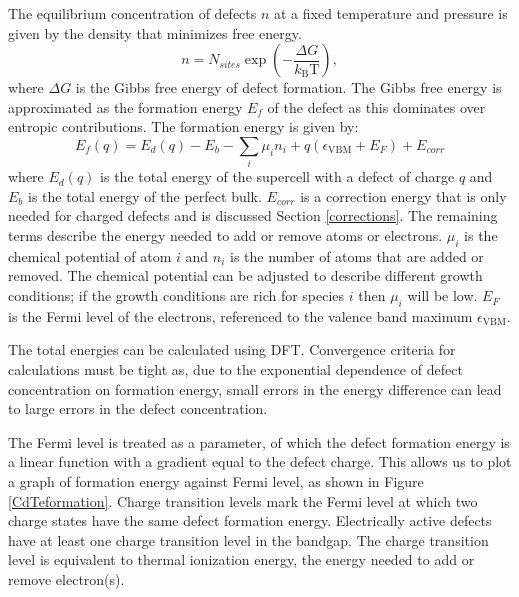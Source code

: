 The equilibrium concentration of defects $n$ at a fixed temperature and pressure is given by the density that minimizes free energy.
\begin{equation} \label{defectconcentration}
    n = N_{sites} \exp \left(-\frac{\Delta G}{k_\mathrm{B} \mathrm{T}} \right),
\end{equation}
where $\Delta G$ is the Gibbs free energy of defect formation. The Gibbs free energy is approximated as the formation energy $E_f$ of the defect as this dominates over entropic contributions. The formation energy is given by:
\begin{equation} \label{eqn_formation_energy}
E_f(q) = E_d(q) - E_b - \sum_i \mu_i n_i + q(\epsilon_\mathrm{VBM}+E_F) + E_{corr}
\end{equation}
where $E_d(q)$ is the total energy of the supercell with a defect of charge $q$ and $E_b$ is the total energy of the perfect bulk. 
$E_{corr}$ is a correction energy that is only needed for charged defects and is discussed Section \ref{corrections}.
The remaining terms describe the energy needed to add or remove atoms or electrons.
$\mu_i$ is the chemical potential of atom $i$ and $n_i$ is the number of atoms that are added or removed.
The chemical potential can be adjusted to describe different growth conditions; if the growth conditions are rich for species $i$ then $\mu_i$ will be low.
$E_F$ is the Fermi level of the electrons, referenced to the valence band maximum $\epsilon_\mathrm{VBM}$.

The total energies can be calculated using DFT. Convergence criteria for calculations must be tight as, due to the exponential dependence of defect concentration on formation energy, small errors in the energy difference can lead to large errors in the defect concentration.

The Fermi level is treated as a parameter, of which the defect formation energy is a linear function with a gradient equal to the defect charge. This allows us to plot a graph of formation energy against Fermi level, as shown in Figure \ref{CdTeformation}. Charge transition levels mark the Fermi level at which two charge states have the same defect formation energy. Electrically active defects have at least one charge transition level in the bandgap. 
The charge transition level is equivalent to thermal ionization energy, the energy needed to add or remove electron(s). %

